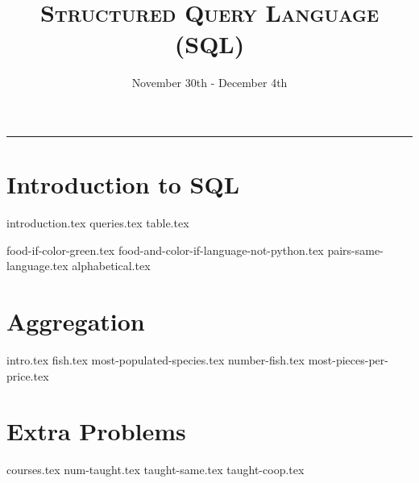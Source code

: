 \documentclass{exam}
\title{\textsc{Structured Query Language (SQL)}}
\date{November 30th - December 4th}
\begin{document}
\maketitle
\rule{\textwidth}{0.15em}
\fontsize{12}{15}\selectfont


\section{Introduction to SQL}
{introduction.tex}
{queries.tex}
\newpage
{table.tex}
\begin{questions}
{food-if-color-green.tex}
{food-and-color-if-language-not-python.tex}
{pairs-same-language.tex}
{alphabetical.tex}

\newpage
\section{Aggregation}
{intro.tex}
{fish.tex}
{most-populated-species.tex}
{number-fish.tex}
{most-pieces-per-price.tex}


\newpage
\section{Extra Problems}
{courses.tex}
{num-taught.tex}
{taught-same.tex}
{taught-coop.tex}

\end{questions}
\end{document}
